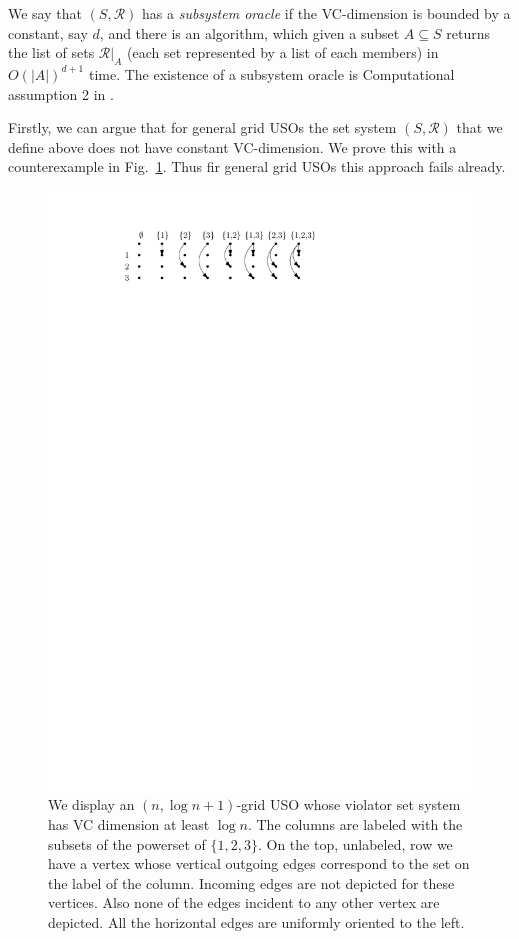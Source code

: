 \documentclass[runningheads,a4paper]{llncs}
\begin{document}
We say that $(S, \mathcal R)$ has a \emph{subsystem oracle} if the VC-dimension is bounded by a constant, say $d$,
and there is an algorithm, which given a subset $A \subseteq S$ returns the list of sets $\mathcal R|_A$ (each set represented by a list of 
each members) in $O(|A|)^{d+1}$ time. The existence of a subsystem oracle is Computational assumption 2 in \cite{ChazelleM96}. 

Firstly, we can argue that for general grid USOs the set system $(S, \mathcal R)$ that we define above does not 
have constant VC-dimension. We prove this with a counterexample in Fig.~\ref{fig:shatteredgrid}. Thus fir 
general grid USOs this approach fails already.

\begin{figure}[h!] 
  	\centering
  	\includegraphics{shatteredgrid.pdf}
  	\caption{\small We display an $(n,\log n + 1)$-grid USO whose violator set system has VC dimension at least $\log n$. 
	  The columns are labeled with the subsets of the powerset of $\{1,2,3\}$. On the top, unlabeled, row we have a vertex whose 
	  vertical outgoing edges correspond to the set on the label of the column. Incoming edges are not depicted for these vertices. Also none 
	  of the edges incident to any other vertex are depicted. All the horizontal edges are uniformly oriented to the left.} 
  	\label{fig:shatteredgrid}
  \end{figure}
 
\end{document}
